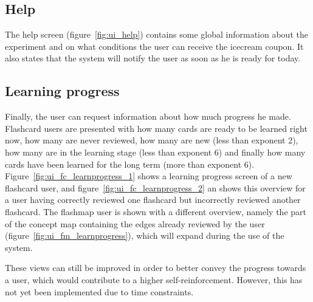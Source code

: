 \subsection{Help}

The help screen (figure~\ref{fig:ui_help}) contains some global information about the experiment and on what conditions the user can receive the icecream coupon. It also states that the system will notify the user as soon as he is ready for today.

\subsection{Learning progress}
\label{sec:learningprogress}

Finally, the user can request information about how much progress he made. Flashcard users are presented with how many cards are ready to be learned right now, how many are never reviewed, how many are new (less than exponent 2), how many are in the learning stage (less than exponent 6) and finally how many cards have been learned for the long term (more than exponent 6). Figure~\ref{fig:ui_fc_learnprogress_1} shows a learning progress screen of a new flashcard user, and figure~\ref{fig:ui_fc_learnprogress_2} an shows this overview for a user having correctly reviewed one flashcard but incorrectly reviewed another flashcard. The flashmap user is shown with a different overview, namely the part of the concept map containing the edges already reviewed by the user (figure~\ref{fig:ui_fm_learnprogress}), which will expand during the use of the system.

These views can still be improved in order to better convey the progress towards a user, which would contribute to a higher self-reinforcement. However, this has not yet been implemented due to time constraints.
